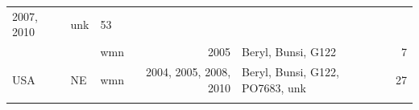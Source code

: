 \begin{longtable}[]{@{}lllrlr@{}}
\begin{minipage}[t]{0.19\columnwidth}
2007, 2010\strut
\end{minipage} & \begin{minipage}[t]{0.29\columnwidth}\raggedright\strut
unk\strut
\end{minipage} & \begin{minipage}[t]{0.04\columnwidth}\raggedleft\strut
53\strut
\end{minipage}\tabularnewline
\begin{minipage}[t]{0.11\columnwidth}\raggedright\strut
\strut
\end{minipage} & \begin{minipage}[t]{0.08\columnwidth}\raggedright\strut
\strut
\end{minipage} & \begin{minipage}[t]{0.12\columnwidth}\raggedright\strut
wmn\strut
\end{minipage} & \begin{minipage}[t]{0.19\columnwidth}\raggedleft\strut
2005\strut
\end{minipage} & \begin{minipage}[t]{0.29\columnwidth}\raggedright\strut
Beryl, Bunsi, G122\strut
\end{minipage} & \begin{minipage}[t]{0.04\columnwidth}\raggedleft\strut
7\strut
\end{minipage}\tabularnewline
\begin{minipage}[t]{0.11\columnwidth}\raggedright\strut
USA\strut
\end{minipage} & \begin{minipage}[t]{0.08\columnwidth}\raggedright\strut
NE\strut
\end{minipage} & \begin{minipage}[t]{0.12\columnwidth}\raggedright\strut
wmn\strut
\end{minipage} & \begin{minipage}[t]{0.19\columnwidth}\raggedleft\strut
2004, 2005, 2008, 2010\strut
\end{minipage} & \begin{minipage}[t]{0.29\columnwidth}\raggedright\strut
Beryl, Bunsi, G122, PO7683, unk\strut
\end{minipage} & \begin{minipage}[t]{0.04\columnwidth}\raggedleft\strut
27\strut
\end{minipage}\tabularnewline
\begin{minipage}[t]{0.11\columnwidth}\raggedright\strut
\strut
\end{minipage} & \begin{minipage}[t]{0.08\columnwidth}\raggedright\strut

\end{minipage}
\end{longtable}
